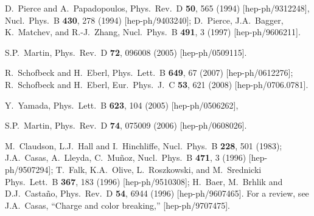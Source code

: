 \documentclass[11pt]{article}
\def\perspectives{in {\it Perspectives on Supersymmetry}, ed.
G.L.~Kane (World Scientific, 1998)}
\begin{document}
\begin{thebibliography}{999}
D.~Pierce and A.~Papadopoulos,
  Phys.\ Rev.\ D {\bf 50}, 565 (1994)
  [hep-ph/9312248],
  Nucl.\ Phys.\ B {\bf 430}, 278 (1994)
  [hep-ph/9403240];
D.~Pierce, J.A.~Bagger, K.~Matchev, and R.-J.~Zhang,
  Nucl.\ Phys.\ B {\bf 491}, 3 (1997)
  [hep-ph/9606211].

S.P.~Martin,
  Phys.\ Rev.\ D {\bf 72}, 096008 (2005)
  [hep-ph/0509115].

R.~Schofbeck and H.~Eberl,
  Phys.\ Lett.\  B {\bf 649}, 67 (2007)
  [hep-ph/0612276];
R.~Schofbeck and H.~Eberl,
  Eur.\ Phys.\ J.\  C {\bf 53}, 621 (2008)
  [hep-ph/0706.0781].

Y.~Yamada,
  Phys.\ Lett.\ B {\bf 623}, 104 (2005)
  [hep-ph/0506262],

  S.P.~Martin,
  Phys.\ Rev.\  D {\bf 74}, 075009 (2006)
  [hep-ph/0608026].
  
M.~Claudson, L.J.~Hall and I.~Hinchliffe, 
  Nucl.\ Phys.\ B {\bf 228}, 501 (1983);
J.A.~Casas, A.~Lleyda, C.~Mu\~noz, 
  Nucl.\ Phys.\ B {\bf 471}, 3 (1996)
  [hep-ph/9507294];
T.~Falk, K.A.~Olive, L.~Roszkowski, and M.~Srednicki
  Phys.\ Lett.\ B {\bf 367}, 183 (1996)
  [hep-ph/9510308];
H.~Baer, M.~Brhlik and D.J.~Casta\~no,
  Phys.\ Rev.\ D {\bf 54}, 6944 (1996)
  [hep-ph/9607465].
For a review, see 
J.A.~Casas,
  ``Charge and color breaking,''
  [hep-ph/9707475].


\end{thebibliography}
\end{document}
